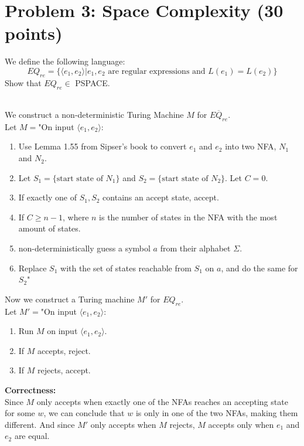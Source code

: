 \documentclass[a4paper,addpoints
	]{exam}
\begin{document}
\section*{Problem 3: Space Complexity (30 points)} 
\begin{questions}
	\question[30] We define the following language:
	\[
		EQ_{re} = \{\langle e_1, e_2\rangle | e_1,e_2\text{ are regular expressions and } L(e_1) = L(e_2) \}
	\]
	Show that $EQ_{re} \in$ PSPACE.
\end{questions}
\begin{solutionbox}{} \\
    We construct a non-deterministic Turing Machine $M$ for $\overline{EQ_{re}}$. \\ 
    Let $M = $"On input $\langle e_1, e_2 \rangle$:
    \begin{enumerate}
	\item Use Lemma 1.55 from Sipser's book to convert $e_1$ and $e_2$ into two NFA, $N_1$ and $N_2$.
	\item Let $S_1 = \{ \text{start state of }N_1\}$ and $S_2 = \{ \text{start state of }N_2\}$. Let $C = 0$.
	\item If exactly one of $S_1,S_2$ contains an accept state, accept.
	\item If $C \geq n - 1$, where $n$ is the number of states in the NFA with the most amount of states.
	\item non-deterministically guess a symbol $a$ from their alphabet $\Sigma$.
	\item Replace $S_1$ with the set of states reachable from $S_1$ on $a$, and do the same for $S_2$"
    \end{enumerate}
    Now we construct a Turing machine $M'$ for $EQ_{re}$. \\
    Let $M' = $"On input $\langle e_1, e_2 \rangle$:
    \begin{enumerate}
    	\item Run $M$ on input $\langle e_1, e_2 \rangle$.
	\item If $M$ accepts, reject.
	\item If $M$ rejects, accept.
    \end{enumerate}
    
    \noindent\textbf{\large Correctness:} \\
    Since $M$ only accepts when exactly one of the NFAs reaches an accepting state for some $w$, we can conclude that $w$ is only in one of the two NFAs, making them different. 
    And since $M'$ only accepts when $M$ rejects, $M$ accepts only when $e_1$ and $e_2$ are equal.
    

\end{solutionbox}
\end{document}
